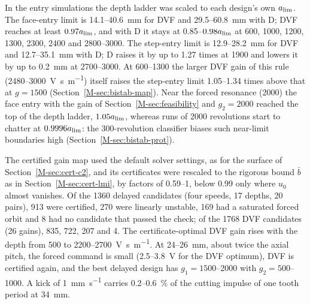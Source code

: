 In the entry simulations the depth ladder was scaled to each design's own $a_{\lim}$. The face-entry limit is 14.1--\SI{40.6}{\milli\metre} for DVF and 29.5--\SI{60.8}{\milli\metre} with D; DVF reaches at least $0.97a_{\lim}$, and with D it stays at 0.85--$0.98a_{\lim}$ at 600, 1000, 1200, 1300, 2300, 2400 and 2800--\SI{3000}{\rpm}. The step-entry limit is 12.9--\SI{28.2}{\milli\metre} for DVF and 12.7--\SI{35.1}{\milli\metre} with D; D raises it by up to 1.27 times at \SI{1900}{\rpm} and lowers it by up to \SI{0.2}{\milli\metre} at \SIrange{2700}{3000}{\rpm}. At \SIrange{600}{1300}{\rpm} the larger DVF gain of this rule (2480--\SI{3000}{\volt\second\per\metre}) itself raises the step-entry limit 1.05--1.34 times above that at $g=1500$ (Section~\ref{M-sec:bistab-map}). Near the forced resonance (\SI{2000}{\rpm}) the face entry with the gain of Section~\ref{M-sec:feasibility} and $g_2=2000$ reached the top of the depth ladder, $1.05a_{\lim}$, whereas runs of 2000 revolutions start to chatter at $0.9996a_{\lim}$: the 300-revolution classifier biases such near-limit boundaries high (Section~\ref{M-sec:bistab-prot}).

The certified gain map used the default solver settings, as for the surface of Section~\ref{M-sec:cert-c2}, and its certificates were rescaled to the rigorous bound $\bar b$ as in Section~\ref{M-sec:cert-lmi}, by factors of 0.59--1, below 0.99 only where $u_0$ almost vanishes. Of the 1360 delayed candidates (four speeds, 17 depths, 20 pairs), 913 were certified, 270 were linearly unstable, 169 had a saturated forced orbit and 8 had no candidate that passed the check; of the 1768 DVF candidates (26 gains), 835, 722, 207 and 4. The certificate-optimal DVF gain rises with the depth from 500 to 2200--\SI{2700}{\volt\second\per\metre}. At 24--\SI{26}{\milli\metre}, about twice the axial pitch, the forced command is small (2.5--\SI{3.8}{\volt} for the DVF optimum), DVF is certified again, and the best delayed design has $g_1=1500$--2000 with $g_2=500$--1000. A kick of \SI{1}{\milli\metre\per\second} carries 0.2--\SI{0.6}{\percent} of the cutting impulse of one tooth period at \SI{34}{\milli\metre}.

